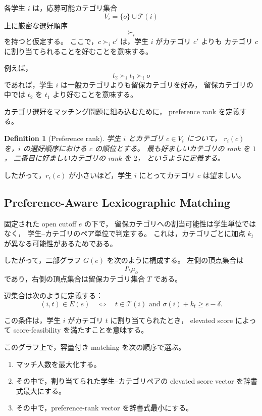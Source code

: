 \documentclass[
  12pt,
  a4paper,
  oneside,
  onecolumn,
  titlepage,
  final
]{jsarticle}
\newtheorem{definition}{Definition}
\newcommand{\1}{\mathbf{1}}
\begin{document}
各学生 $i$ は，応募可能カテゴリ集合
\[
    V_i=\{o\}\cup\mathcal T(i)
\]
上に厳密な選好順序
\[
    \succ_i
\]
を持つと仮定する。
ここで，$c\succ_i c'$ は，学生 $i$ がカテゴリ $c'$ よりも
カテゴリ $c$ に割り当てられることを好むことを意味する。

例えば，
\[
    t_2\succ_i t_1\succ_i o
\]
であれば，学生 $i$ は一般カテゴリよりも留保カテゴリを好み，
留保カテゴリの中では $t_2$ を $t_1$ より好むことを意味する。

カテゴリ選好をマッチング問題に組み込むために，
preference rank を定義する。

\begin{definition}[Preference rank]
学生 $i$ とカテゴリ $c\in V_i$ について，
$r_i(c)$ を，$i$ の選好順序における $c$ の順位とする。
最も好ましいカテゴリの rank を $1$，
二番目に好ましいカテゴリの rank を $2$，
というように定義する。
\end{definition}

したがって，$r_i(c)$ が小さいほど，学生 $i$ にとってカテゴリ $c$ は望ましい。

\subsection{Preference-Aware Lexicographic Matching}

固定された open cutoff $e$ の下で，
留保カテゴリへの割当可能性は学生単位ではなく，
学生--カテゴリのペア単位で判定する。
これは，カテゴリごとに加点 $k_t$ が異なる可能性があるためである。

したがって，二部グラフ $G(e)$ を次のように構成する。
左側の頂点集合は
\[
    I\setminus \mu_o
\]
であり，右側の頂点集合は留保カテゴリ集合 $T$ である。

辺集合は次のように定義する：
\[
    (i,t)\in E(e)
    \quad\Longleftrightarrow\quad
    t\in\mathcal T(i)
    \text{ and }
    \sigma(i)+k_t\ge e-\delta.
\]

この条件は，学生 $i$ がカテゴリ $t$ に割り当てられたとき，
elevated score によって score-feasibility を満たすことを意味する。

このグラフ上で，容量付き matching を次の順序で選ぶ。

\begin{enumerate}
    \item マッチ人数を最大化する。
    \item その中で，割り当てられた学生--カテゴリペアの elevated score vector を辞書式最大にする。
    \item その中で，preference-rank vector を辞書式最小にする。
\end{enumerate}
\end{document}

